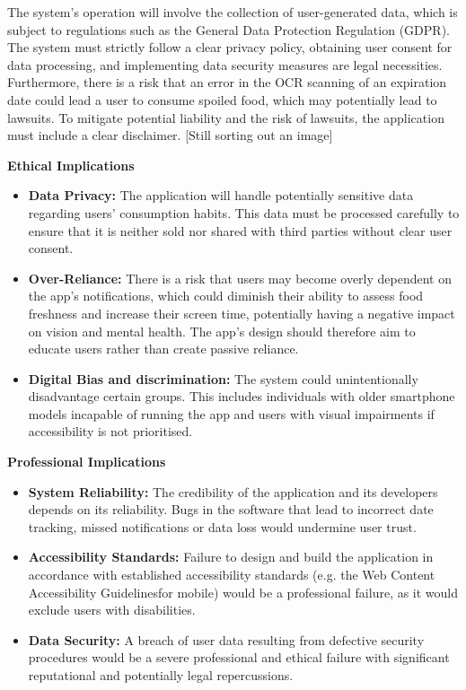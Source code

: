 The system's operation will involve the collection of user-generated data, which is subject to regulations such as the General Data Protection Regulation (GDPR). The system must strictly follow a clear privacy policy, obtaining user consent for data processing, and implementing data security measures are legal necessities. Furthermore, there is a risk that an error in the OCR scanning of an expiration date could lead a user to consume spoiled food, which may potentially lead to lawsuits. To mitigate potential liability and the risk of lawsuits, the application must include a clear disclaimer. [Still sorting out an image]

\vspace{6pt}

\textbf{Ethical Implications}
\par
\begin{itemize}
    \item \textbf{Data Privacy:} The application will handle potentially sensitive data regarding users' consumption habits. This data must be processed carefully to ensure that it is neither sold nor shared with third parties without clear user consent.
    \item \textbf{Over-Reliance:} There is a risk that users may become overly dependent on the app's notifications, which could diminish their ability to assess food freshness and increase their screen time, potentially having a negative impact on vision and mental health. The app's design should therefore aim to educate users rather than create passive reliance.
    \item \textbf{Digital Bias and discrimination:} The system could unintentionally disadvantage certain groups. This includes individuals with older smartphone models incapable of running the app and users with visual impairments if accessibility is not prioritised.
\end{itemize}

\vspace{6pt}

\textbf{Professional Implications}
\par
\begin{itemize}
    \item \textbf{System Reliability:} The credibility of the application and its developers depends on its reliability. Bugs in the software that lead to incorrect date tracking, missed notifications or data loss would undermine user trust.
    \item \textbf{Accessibility Standards:} Failure to design and build the application in accordance with established accessibility standards (e.g. the Web Content Accessibility Guidelinesfor mobile) would be a professional failure, as it would exclude users with disabilities.
    \item \textbf{Data Security:} A breach of user data resulting from defective security procedures would be a severe professional and ethical failure with significant reputational and potentially legal repercussions.
\end{itemize}



